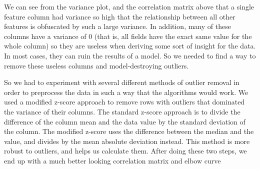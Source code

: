 \documentclass[20pt]{article} %
\begin{document}
We can see from the variance plot, and the correlation matrix above that a single feature column had variance so high that the relationship between all other features is obfuscated by such a large variance.  In addition, many of these columns have a variance of 0 (that is, all fields have the exact same value for the whole column) so they are useless when deriving some sort of insight for the data.  In most cases, they can ruin the results of a model.  So we needed to find a way to remove these useless columns and model-destroying outliers.


So we had to experiment with several different methods of outlier removal in order to preprocess the data in such a way that the algorithms would work.  We used a modified z-score approach to remove rows with outliers that dominated the variance of their columns.  The standard z-score approach is to divide the difference of the column mean and the data value by the standard deviation of the column.  The modified z-score uses the difference between the median and the value, and divides by the mean absolute deviation instead.  This method is more robust to outliers, and helps us calculate them. After doing these two steps, we end up with a much better looking correlation matrix and elbow curve
\end{document}
